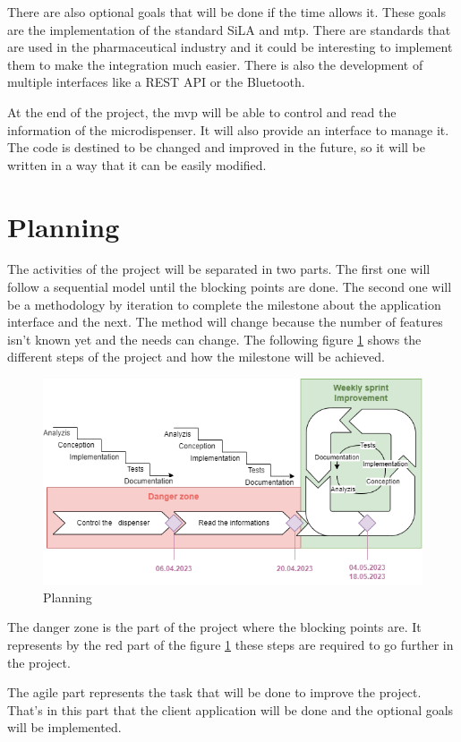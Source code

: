 There are also optional goals that will be done if the time allows it.
These goals are the implementation of the standard SiLA and \acrfull{mtp}.
There are standards that are used in the pharmaceutical industry and it could be interesting to implement them to make the integration much easier.
There is also the development of multiple interfaces like a REST API or the Bluetooth.

At the end of the project, the \acrshort{mvp} will be able to control and read the information of the microdispenser.
It will also provide an interface to manage it.
The code is destined to be changed and improved in the future, so it will be written in a way that it can be easily modified.


\section{Planning}
\label{ch:introduction:planning}

The activities of the project will be separated in two parts.
The first one will follow a sequential model until the blocking points are done.
The second one will be a methodology by iteration to complete the milestone about the application interface and the next.
The method will change because the number of features isn't known yet and the needs can change.
The following figure \ref{fig:planning} shows the different steps of the project and how the milestone will be achieved.

\begin{figure}[ht]
    \centering
    \includegraphics[width=1\textwidth]{img/planning.drawio.png}
    \caption{Planning}
    \label{fig:planning}
\end{figure}

The danger zone is the part of the project where the blocking points are.
It represents by the red part of the figure \ref{fig:planning} these steps are required to go further in the project.

The agile part represents the task that will be done to improve the project.
That's in this part that the client application will be done and the optional goals will be implemented.
